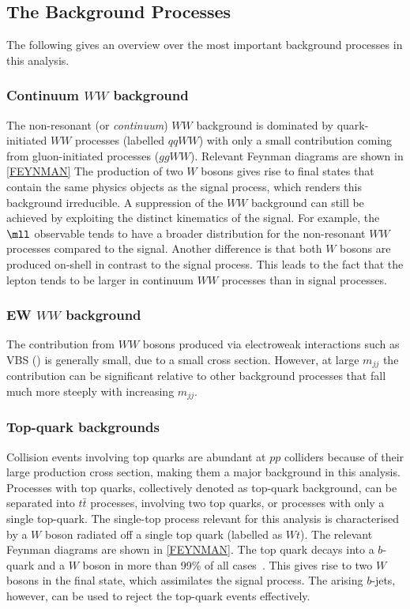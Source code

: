 \subsection{The Background Processes}
The following gives an overview over the most important background processes in this analysis.

\subsubsection{Continuum $WW$ background}
The non-resonant (or \emph{continuum}) $WW$ background is dominated by quark-initiated $WW$ processes (labelled $qqWW$) with only a small contribution coming from gluon-initiated processes ($ggWW$). 
Relevant Feynman diagrams are shown in \cref{FEYNMAN}
The production of two $W$ bosons gives rise to final states that contain the same physics objects as the signal process, which renders this background irreducible. 
A suppression of the $WW$ background can still be achieved by exploiting the distinct kinematics of the signal. For example, the $\mll$ observable tends to have a broader distribution for the non-resonant $WW$ processes compared to the signal. 
Another difference is that both $W$ bosons are produced on-shell in contrast to the signal process. 
This leads to the fact that the lepton \pT tends to be larger in continuum $WW$ processes than in signal processes.

\subsubsection{EW $WW$ background}
The contribution from $WW$ bosons produced via electroweak interactions such as VBS () is generally small, due to a small cross section. However, at large $m_{jj}$ the contribution can be significant relative to other background processes that fall much more steeply with increasing $m_{jj}$. 

\subsubsection{Top-quark backgrounds}
Collision events involving top quarks are abundant at $pp$ colliders because of their large production cross section, making them a major background in this analysis.
Processes with top quarks, collectively denoted as top-quark background, can be separated into $t\bar{t}$ processes, involving two top quarks, or processes with only a single top-quark. 
The single-top process relevant for this analysis is characterised by a $W$ boson radiated off a single top quark (labelled as $Wt$). 
The relevant Feynman diagrams are shown in \cref{FEYNMAN}.
The top quark decays into a $b$-quark and a $W$ boson in more than 99\% of all cases~\cite{PDG2020}. 
This gives rise to two $W$ bosons in the final state, which assimilates the signal process. The arising $b$-jets, however, can be used to reject the top-quark events effectively.


